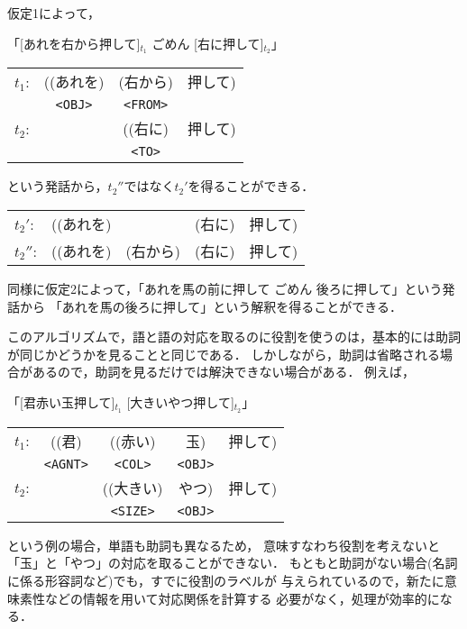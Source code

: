仮定1によって，
\begin{center}
\begin{mbox}
「[あれを右から押して]$_{t_1}$ ごめん [右に押して]$_{t_2}$」\\
\begin{tabular}{lccc}
$t_1$:& ((あれを) & (右から) & 押して)\\
      &\verb+<OBJ>+&\verb+<FROM>+\\
$t_2$:&         & ((右に)  & 押して)\\
      &         &\verb+<TO>+&\\
\end{tabular}
\end{mbox}
\end{center}
という発話から，$t_2''$ではなく$t_2'$を得ることができる．
\begin{center}
\begin{tabular}{lcccc}
$t_2'$:& ((あれを) & & (右に) & 押して)\\
$t_2''$:& ((あれを) & (右から)& (右に) & 押して)\\
\end{tabular}
\end{center}
同様に仮定2によって，「あれを馬の前に押して ごめん 後ろに押して」という発話から
「あれを馬の後ろに押して」という解釈を得ることができる．

このアルゴリズムで，語と語の対応を取るのに役割を使うのは，基本的には助詞が同じかどうかを見ることと同じである．
しかしながら，助詞は省略される場合があるので，助詞を見るだけでは解決できない場合がある．
例えば，
\begin{center}
\begin{mbox}
「[君赤い玉押して]$_{t_1}$ [大きいやつ押して]$_{t_2}$」\\
\begin{tabular}{lcccc}
$t_1$:& ((君) & ((赤い)   & 玉) & 押して)\\
      &\verb+<AGNT>+&\verb+<COL>+&\verb+<OBJ>+&\\
$t_2$:&         & ((大きい) & やつ) & 押して)\\
      &         &\verb+<SIZE>+&\verb+<OBJ>+&\\
\end{tabular}
\end{mbox}
\end{center}
という例の場合，単語も助詞も異なるため，
意味すなわち役割を考えないと「玉」と「やつ」の対応を取ることができない．
もともと助詞がない場合(名詞に係る形容詞など)でも，すでに役割のラベルが
与えられているので，新たに意味素性などの情報を用いて対応関係を計算する
必要がなく，処理が効率的になる．

